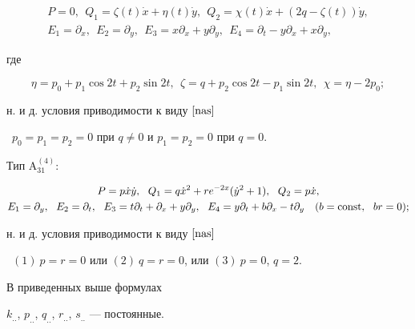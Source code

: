 \begin{thms}
\begin{gather*}
P=0,\ \


Q_1=\zeta(t)\Dot x+\eta (t)\Dot y,\ \


Q_2= \chi (t)\Dot x+(2q-\zeta(t))\Dot y, \\


E_1=\partial_x,\ \ E_2=\partial_ y,\ \ E_3=x\partial_ x+y\partial_y,


\ \ E_4=\partial_t-y\partial_x+ x\partial_y,


\end{gather*}


где


$$


\eta=p_0 +p_1\cos 2t+p_2\sin 2t,\ \


\zeta=q +p_2\cos 2t -{p_1}\sin 2t,\ \ \chi=\eta-2p_0;


$$


н. и д. условия приводимости к виду $\eqref{nas}$


\ $p_0=p_1=p_2=0$ при $q\neq 0$ и $p_1=p_2=0$ при $ q=0$.





Тип $\mathrm{A^{(4)}_{31}}{:}$


\begin{gather*}


P=p\Dot x\Dot y,\ \


Q_1=q\Dot x^2+re^{-2x}(\Dot y^2+1),\ \ Q_2=p\Dot x,\\


E_1=\partial_y,\ \ E_2=\partial_ t,\ \


E_3=t\partial_t+\partial_x+y\partial_y,\ \


E_4=y\partial_t+b\partial_x-t\partial_y \quad (b=\const,\ \ br=0);


\end{gather*}


н. и д. условия приводимости к виду $\eqref{nas}$


\ $(1)\ p=r=0$ или $(2)\ q=r=0$, или $(3)\ p=0$, $q=2$.





В приведенных выше формулах 


$k_{..}$, $p_{..}$, $q_{..}$, $r_{..}$, $s_{..}$ --- постоянные.


\end{thms}











